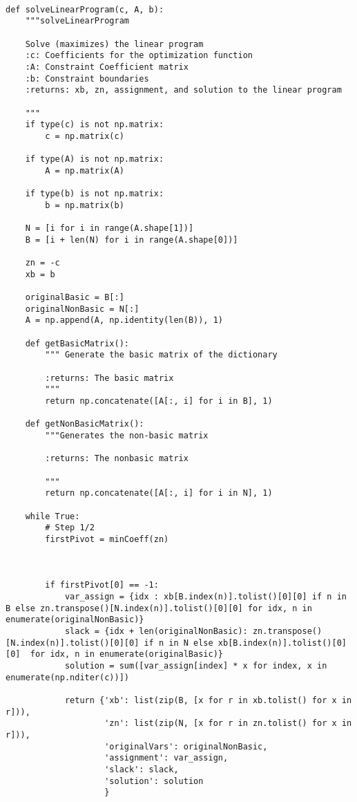 \documentclass{article}
\begin{document}
\begin{lstlisting}

def solveLinearProgram(c, A, b):
    """solveLinearProgram

    Solve (maximizes) the linear program
    :c: Coefficients for the optimization function
    :A: Constraint Coefficient matrix
    :b: Constraint boundaries
    :returns: xb, zn, assignment, and solution to the linear program

    """
    if type(c) is not np.matrix:
        c = np.matrix(c)

    if type(A) is not np.matrix:
        A = np.matrix(A)

    if type(b) is not np.matrix:
        b = np.matrix(b)

    N = [i for i in range(A.shape[1])]
    B = [i + len(N) for i in range(A.shape[0])]

    zn = -c
    xb = b

    originalBasic = B[:]
    originalNonBasic = N[:]
    A = np.append(A, np.identity(len(B)), 1)

    def getBasicMatrix():
        """ Generate the basic matrix of the dictionary

        :returns: The basic matrix
        """
        return np.concatenate([A[:, i] for i in B], 1)

    def getNonBasicMatrix():
        """Generates the non-basic matrix

        :returns: The nonbasic matrix

        """
        return np.concatenate([A[:, i] for i in N], 1)

    while True:
        # Step 1/2
        firstPivot = minCoeff(zn)



        if firstPivot[0] == -1:
            var_assign = {idx : xb[B.index(n)].tolist()[0][0] if n in B else zn.transpose()[N.index(n)].tolist()[0][0] for idx, n in enumerate(originalNonBasic)}
            slack = {idx + len(originalNonBasic): zn.transpose()[N.index(n)].tolist()[0][0] if n in N else xb[B.index(n)].tolist()[0][0]  for idx, n in enumerate(originalBasic)}
            solution = sum([var_assign[index] * x for index, x in enumerate(np.nditer(c))])

            return {'xb': list(zip(B, [x for r in xb.tolist() for x in r])),
                    'zn': list(zip(N, [x for r in zn.tolist() for x in r])),
                    'originalVars': originalNonBasic,
                    'assignment': var_assign,
                    'slack': slack,
                    'solution': solution
                    }


\end{lstlisting}
\end{document}
